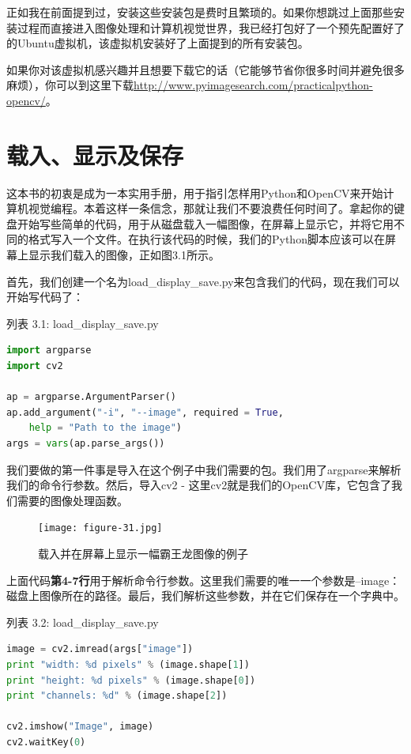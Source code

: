 \documentclass[color=cyan,mathpazo,titlestyle=hang]{elegantbook}
\begin{document}
正如我在前面提到过，安装这些安装包是费时且繁琐的。如果你想跳过上面那些安装过程而直接进入图像处理和计算机视觉世界，我已经打包好了一个预先配置好了的Ubuntu虚拟机，该虚拟机安装好了上面提到的所有安装包。

如果你对该虚拟机感兴趣并且想要下载它的话（它能够节省你很多时间并避免很多麻烦），你可以到这里下载\href{http://www.pyimagesearch.com/practicalpython-opencv/}{http://www.pyimagesearch.com/practicalpython-opencv/}。

\chapter{载入、显示及保存}

这本书的初衷是成为一本实用手册，用于指引怎样用Python和OpenCV来开始计算机视觉编程。本着这样一条信念，那就让我们不要浪费任何时间了。拿起你的键盘开始写些简单的代码，用于从磁盘载入一幅图像，在屏幕上显示它，并将它用不同的格式写入一个文件。在执行该代码的时候，我们的Python脚本应该可以在屏幕上显示我们载入的图像，正如图3.1所示。

首先，我们创建一个名为load\_display\_save.py来包含我们的代码，现在我们可以开始写代码了：

列表 3.1: load\_display\_save.py

\begin{lstlisting}[language=python]
import argparse
import cv2

ap = argparse.ArgumentParser()
ap.add_argument("-i", "--image", required = True,
	help = "Path to the image")
args = vars(ap.parse_args())
\end{lstlisting}

我们要做的第一件事是导入在这个例子中我们需要的包。我们用了argparse来解析我们的命令行参数。然后，导入cv2 - 这里cv2就是我们的OpenCV库，它包含了我们需要的图像处理函数。

\begin{figure}[!hbtp]
\centering  %
\texttt{[image: figure-31.jpg]}
\caption{载入并在屏幕上显示一幅霸王龙图像的例子\label{figur:Tyrannosaurus-Rex}}
\end{figure}

上面代码\textbf{第4-7行}用于解析命令行参数。这里我们需要的唯一一个参数是--image：磁盘上图像所在的路径。最后，我们解析这些参数，并在它们保存在一个字典中。

列表 3.2: load\_display\_save.py

\begin{lstlisting}[language=python]
image = cv2.imread(args["image"])
print "width: %d pixels" % (image.shape[1])
print "height: %d pixels" % (image.shape[0])
print "channels: %d" % (image.shape[2])

cv2.imshow("Image", image)
cv2.waitKey(0)
\end{lstlisting}
\end{document}
